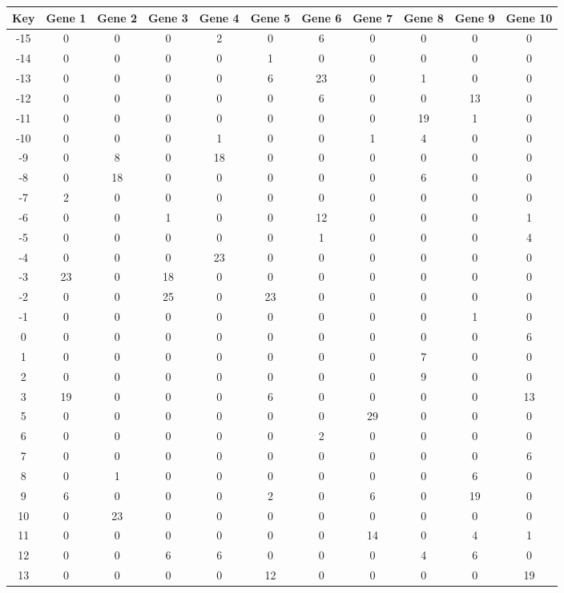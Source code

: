 \begin{tabular}{|c|c|c|c|c|c|c|c|c|c|c|}
\hline
Key & Gene 1 & Gene 2 & Gene 3 & Gene 4 & Gene 5 & Gene 6 & Gene 7 & Gene 8 & Gene 9 & Gene 10 \\
\hline
-15 & 0 & 0 & 0 & 2 & 0 & 6 & 0 & 0 & 0 & 0 \\
-14 & 0 & 0 & 0 & 0 & 1 & 0 & 0 & 0 & 0 & 0 \\
-13 & 0 & 0 & 0 & 0 & 6 & 23 & 0 & 1 & 0 & 0 \\
-12 & 0 & 0 & 0 & 0 & 0 & 6 & 0 & 0 & 13 & 0 \\
-11 & 0 & 0 & 0 & 0 & 0 & 0 & 0 & 19 & 1 & 0 \\
-10 & 0 & 0 & 0 & 1 & 0 & 0 & 1 & 4 & 0 & 0 \\
-9 & 0 & 8 & 0 & 18 & 0 & 0 & 0 & 0 & 0 & 0 \\
-8 & 0 & 18 & 0 & 0 & 0 & 0 & 0 & 6 & 0 & 0 \\
-7 & 2 & 0 & 0 & 0 & 0 & 0 & 0 & 0 & 0 & 0 \\
-6 & 0 & 0 & 1 & 0 & 0 & 12 & 0 & 0 & 0 & 1 \\
-5 & 0 & 0 & 0 & 0 & 0 & 1 & 0 & 0 & 0 & 4 \\
-4 & 0 & 0 & 0 & 23 & 0 & 0 & 0 & 0 & 0 & 0 \\
-3 & 23 & 0 & 18 & 0 & 0 & 0 & 0 & 0 & 0 & 0 \\
-2 & 0 & 0 & 25 & 0 & 23 & 0 & 0 & 0 & 0 & 0 \\
-1 & 0 & 0 & 0 & 0 & 0 & 0 & 0 & 0 & 1 & 0 \\
0 & 0 & 0 & 0 & 0 & 0 & 0 & 0 & 0 & 0 & 6 \\
1 & 0 & 0 & 0 & 0 & 0 & 0 & 0 & 7 & 0 & 0 \\
2 & 0 & 0 & 0 & 0 & 0 & 0 & 0 & 9 & 0 & 0 \\
3 & 19 & 0 & 0 & 0 & 6 & 0 & 0 & 0 & 0 & 13 \\
5 & 0 & 0 & 0 & 0 & 0 & 0 & 29 & 0 & 0 & 0 \\
6 & 0 & 0 & 0 & 0 & 0 & 2 & 0 & 0 & 0 & 0 \\
7 & 0 & 0 & 0 & 0 & 0 & 0 & 0 & 0 & 0 & 6 \\
8 & 0 & 1 & 0 & 0 & 0 & 0 & 0 & 0 & 6 & 0 \\
9 & 6 & 0 & 0 & 0 & 2 & 0 & 6 & 0 & 19 & 0 \\
10 & 0 & 23 & 0 & 0 & 0 & 0 & 0 & 0 & 0 & 0 \\
11 & 0 & 0 & 0 & 0 & 0 & 0 & 14 & 0 & 4 & 1 \\
12 & 0 & 0 & 6 & 6 & 0 & 0 & 0 & 4 & 6 & 0 \\
13 & 0 & 0 & 0 & 0 & 12 & 0 & 0 & 0 & 0 & 19 \\
\hline
\end{tabular}